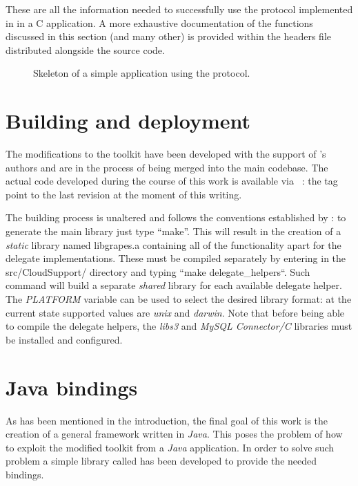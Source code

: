 These are all the information needed to successfully use the
\cloudcast \peersampling protocol implemented in \grapes in a C
application. A more exhaustive documentation of the functions discussed
in this section (and many other) is provided within the headers file
distributed alongside the source code.

\begin{figure}[H]
  \centering
  
  \caption{Skeleton of a simple application using the \cloudcast
    \peersampling protocol.}
  \label{lst:grapes-example-app}
\end{figure}

\section{Building and deployment}
The modifications to the toolkit have been developed with the
support of \grapes's authors and are in the process of being merged
into the main codebase. The actual code developed during the course of
this work is available via \github~\cite{GRAPES-repo}: the tag
\thesistag point to the last revision at the moment of this
writing.

The building process is unaltered and follows the conventions
established by \grapes: to generate the main library just type ``make''. This
will result in the creation of a \emph{static} library named
\textsf{libgrapes.a} containing all of the functionality apart
for the \cloudhelper delegate implementations. These must be compiled
separately by entering in the \textsf{src/CloudSupport/} directory and
typing ``make delegate\_helpers``. Such command will build a
separate \textit{shared} library for each available delegate
helper. The \textit{PLATFORM} variable can be used to select the
desired library format: at the current state supported values are
\textit{unix} and \textit{darwin}.
Note that before being able to compile the delegate helpers, the
\emph{libs3} and \emph{MySQL Connector/C} libraries must be
installed and configured.

\section{Java bindings}
As has been mentioned in the introduction, the final goal of this work is
the creation of a general framework written in \emph{Java}. This poses
the problem of how to exploit the modified \grapes toolkit from a
\emph{Java} application. In order to solve such problem a simple
library called \jgrapes has been developed to provide the needed
bindings.

